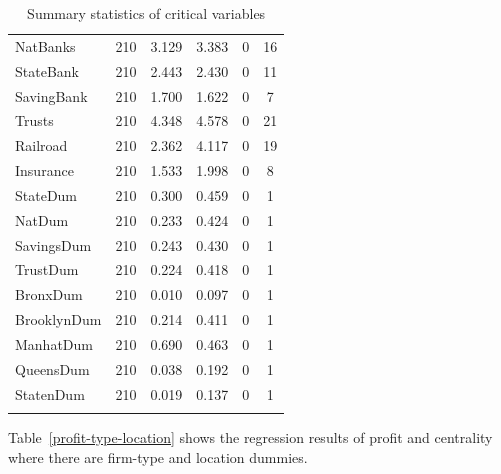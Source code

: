 \documentclass[11pt,fleqn]{article}
\begin{document}
\begin{table}[h!]
\begin{tabular}{lccccc}
		NatBanks & 210 & 3.129 & 3.383 & 0 & 16 \\
		StateBank & 210 & 2.443 & 2.430 & 0 & 11 \\
		SavingBank & 210 & 1.700 & 1.622 & 0 & 7 \\
		Trusts & 210 & 4.348 & 4.578 & 0 & 21 \\
		Railroad & 210 & 2.362 & 4.117 & 0 & 19 \\
		Insurance & 210 & 1.533 & 1.998 & 0 & 8 \\
		StateDum & 210 & 0.300 & 0.459 & 0 & 1 \\
		NatDum & 210 & 0.233 & 0.424 & 0 & 1 \\
		SavingsDum & 210 & 0.243 & 0.430 & 0 & 1 \\
		TrustDum & 210 & 0.224 & 0.418 & 0 & 1 \\
		BronxDum & 210 & 0.010 & 0.097 & 0 & 1 \\
		BrooklynDum & 210 & 0.214 & 0.411 & 0 & 1 \\
		ManhatDum & 210 & 0.690 & 0.463 & 0 & 1 \\
		QueensDum & 210 & 0.038 & 0.192 & 0 & 1 \\
		StatenDum & 210 & 0.019 & 0.137 & 0 & 1 \\
		\hline \\[-1.8ex]
	\end{tabular}
	\label{fin-ss}
	\caption{Summary statistics of critical variables}
\end{table}

Table~\ref{profit-type-location} shows the regression results of profit and centrality where there are firm-type and location dummies.
\end{document}
